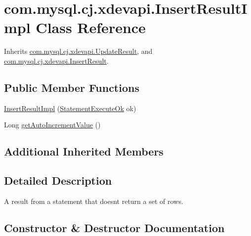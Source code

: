 \hypertarget{classcom_1_1mysql_1_1cj_1_1xdevapi_1_1_insert_result_impl}{}\section{com.\+mysql.\+cj.\+xdevapi.\+Insert\+Result\+Impl Class Reference}
\label{classcom_1_1mysql_1_1cj_1_1xdevapi_1_1_insert_result_impl}


Inherits \mbox{\hyperlink{classcom_1_1mysql_1_1cj_1_1xdevapi_1_1_update_result}{com.\+mysql.\+cj.\+xdevapi.\+Update\+Result}}, and \mbox{\hyperlink{interfacecom_1_1mysql_1_1cj_1_1xdevapi_1_1_insert_result}{com.\+mysql.\+cj.\+xdevapi.\+Insert\+Result}}.

\subsection*{Public Member Functions}
\begin{DoxyCompactItemize}
\item 
\mbox{\hyperlink{classcom_1_1mysql_1_1cj_1_1xdevapi_1_1_insert_result_impl_a67bd773b03aa9f9f06d57f6ce2b7d369}{Insert\+Result\+Impl}} (\mbox{\hyperlink{classcom_1_1mysql_1_1cj_1_1protocol_1_1x_1_1_statement_execute_ok}{Statement\+Execute\+Ok}} ok)
\item 
Long \mbox{\hyperlink{classcom_1_1mysql_1_1cj_1_1xdevapi_1_1_insert_result_impl_a0849fb03ac4d7da386014ce3647e00ea}{get\+Auto\+Increment\+Value}} ()
\end{DoxyCompactItemize}
\subsection*{Additional Inherited Members}


\subsection{Detailed Description}
A result from a statement that doesn\textquotesingle{}t return a set of rows. 

\subsection{Constructor \& Destructor Documentation}
\mbox{\label{classcom_1_1mysql_1_1cj_1_1xdevapi_1_1_insert_result_impl_a67bd773b03aa9f9f06d57f6ce2b7d369}} 
